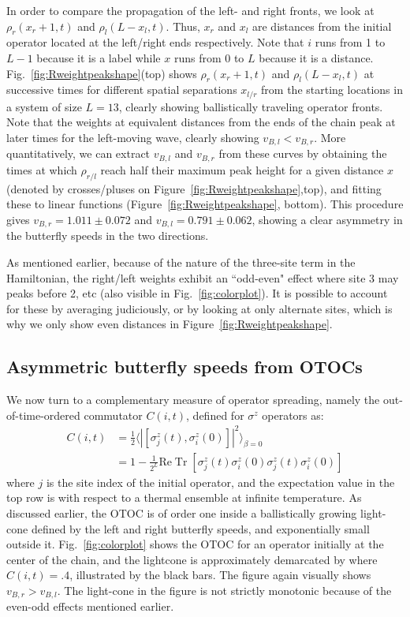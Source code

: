\documentclass[aps,prx,reprint,superscriptaddress, longbibliography]{revtex4-1}
\newcommand{\Tr}{ \mbox{Tr}}
\renewcommand{\Re}{ \mbox{Re}}
\newcommand{\half}{\frac{1}{2}}
\begin{document}
In order to compare the propagation of the left- and right fronts, we look at  $\rho_r(x_r+1,t)$ and $\rho_l(L-x_l,t)$. Thus, $x_{r}$ and $x_l$ are distances from the initial operator located at the left/right ends respectively. Note that $i$ runs from 1 to $L-1$ because it is a label while $x$ runs from 0 to $L$ because it is a distance. Fig.~\ref{fig:Rweightpeakshape}(top) shows $\rho_r(x_r+1,t)$ and $\rho_l(L-x_l,t)$ at successive times for different spatial separations $x_{l/r}$ from the starting locations in a system of size $L=13$, clearly showing ballistically traveling operator fronts. Note that the weights at equivalent distances from the ends of the chain peak at later times for the left-moving wave,  clearly showing $v_{B,l}<v_{B,r}$. More quantitatively, we can extract $v_{B,l}$ and $v_{B,r}$ from these curves by obtaining the times at which $\rho_{r/l}$ reach half their maximum peak height for a given distance $x$ (denoted by crosses/pluses on Figure~\ref{fig:Rweightpeakshape},top), and fitting these to linear functions (Figure~\ref{fig:Rweightpeakshape}, bottom). This procedure gives $v_{B,r}=1.011 \pm 0.072$ and $v_{B,l}=0.791 \pm 0.062$, showing a clear asymmetry in the butterfly speeds in the two directions. 

As mentioned earlier, because of the nature of the three-site term in the Hamiltonian, the right/left weights exhibit an ``odd-even" effect where site 3 may peaks before 2, etc (also visible in Fig.~\ref{fig:colorplot}). It is possible to account for these by averaging judiciously, or by  looking at only alternate sites, which is why we only show even distances in Figure~\ref{fig:Rweightpeakshape}. 



\subsection{Asymmetric butterfly speeds from OTOCs}

We now turn to a complementary measure of operator spreading, namely the out-of-time-ordered commutator $C(i,t)$, defined for $\sigma^z$ operators as: 
\begin{align}
C(i,t) & = \half \langle|[\sigma^z_j(t),\sigma^z_i(0)]|^2\rangle_{\beta=0}\nonumber\\
&= 1 - \frac{1}{2^{L}}\Re\;\Tr\;[\sigma^z_j(t)\sigma^z_i(0)\sigma^z_j(t)\sigma^z_i(0)]
\label{eq:otoc}
\end{align}
where $j$ is the site index of the initial operator, and the expectation value in the top row is with respect to a thermal ensemble at infinite temperature. As discussed earlier, the OTOC is of order one inside a ballistically growing light-cone defined by the left and right butterfly speeds, and exponentially small outside it.  Fig.~\ref{fig:colorplot} shows the OTOC for an operator initially at the center of the chain, and the lightcone is approximately demarcated by where $C(i,t)= .4$, illustrated by the black bars. The figure again visually shows $v_{B,r} > v_{B,l}$.  The light-cone in the figure is not strictly monotonic because of the even-odd effects mentioned earlier. 
\end{document}
